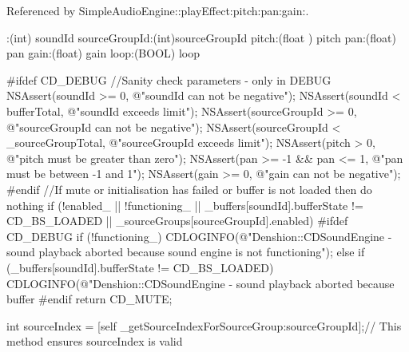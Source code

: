 Referenced by Simple\-Audio\-Engine\-::play\-Effect\-:pitch\-:pan\-:gain\-:.


\begin{DoxyCode}
                   :(int) soundId sourceGroupId:(int)sourceGroupId pitch:(float
      ) pitch pan:(float) pan gain:(float) gain loop:(BOOL) loop {

#ifdef CD_DEBUG
        //Sanity check parameters - only in DEBUG
        NSAssert(soundId >= 0, @"soundId can not be negative");
        NSAssert(soundId < bufferTotal, @"soundId exceeds limit");
        NSAssert(sourceGroupId >= 0, @"sourceGroupId can not be negative");
        NSAssert(sourceGroupId < _sourceGroupTotal, @"sourceGroupId exceeds
       limit");
        NSAssert(pitch > 0, @"pitch must be greater than zero");
        NSAssert(pan >= -1 && pan <= 1, @"pan must be between -1 and 1");
        NSAssert(gain >= 0, @"gain can not be negative");
#endif
        //If mute or initialisation has failed or buffer is not loaded then do
       nothing
        if (!enabled_ || !functioning_ || _buffers[soundId].bufferState != 
      CD_BS_LOADED || _sourceGroups[sourceGroupId].enabled) {
#ifdef CD_DEBUG
                if (!functioning_) {
                        CDLOGINFO(@"Denshion::CDSoundEngine - sound playback
       aborted because sound engine is not functioning");
                } else if (_buffers[soundId].bufferState != CD_BS_LOADED) {
                        CDLOGINFO(@"Denshion::CDSoundEngine - sound playback
       aborted because buffer %
                }
#endif
                return CD_MUTE;
        }

        int sourceIndex = [self _getSourceIndexForSourceGroup:sourceGroupId];//
      This method ensures sourceIndex is valid

}
\end{DoxyCode}
